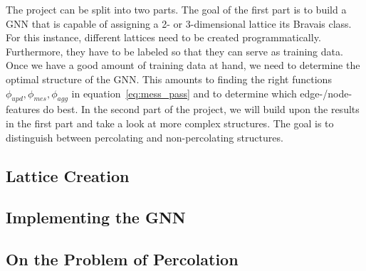 \label{sec:goalsImpl}

The project can be split into two parts. The goal of the first part is to build a GNN that is capable of assigning a 2- or 3-dimensional lattice its Bravais class. 
For this instance, different lattices need to be created programmatically. Furthermore, they have to be labeled so that they can serve as training data.
Once we have a good amount of training data at hand, we need to determine the optimal structure of the GNN. This amounts to finding the
right functions $\phi_{upd},\phi_{mes},\phi_{agg}$ in equation~\ref{eq:mess_pass} and to determine which edge-/node-features do best.
In the second part of the project, we will build upon the results in the first part and take a look at more complex structures. The goal is to distinguish between percolating and non-percolating structures.

\subsection{Lattice Creation}


\subsection{Implementing the GNN}


\subsection{On the Problem of Percolation}

